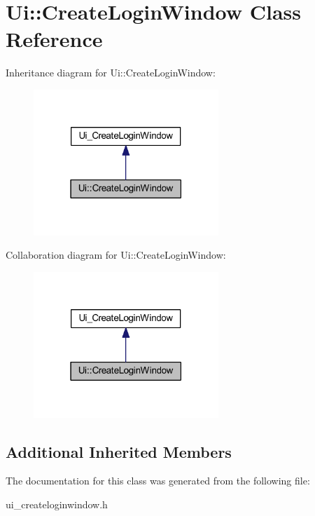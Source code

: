 \hypertarget{class_ui_1_1_create_login_window}{}\section{Ui\+:\+:Create\+Login\+Window Class Reference}
\label{class_ui_1_1_create_login_window}


Inheritance diagram for Ui\+:\+:Create\+Login\+Window\+:
\nopagebreak
\begin{figure}[H]
\begin{center}
\leavevmode
\includegraphics[width=198pt]{class_ui_1_1_create_login_window__inherit__graph}
\end{center}
\end{figure}


Collaboration diagram for Ui\+:\+:Create\+Login\+Window\+:
\nopagebreak
\begin{figure}[H]
\begin{center}
\leavevmode
\includegraphics[width=198pt]{class_ui_1_1_create_login_window__coll__graph}
\end{center}
\end{figure}
\subsection*{Additional Inherited Members}


The documentation for this class was generated from the following file\+:\begin{DoxyCompactItemize}
\item 
ui\+\_\+createloginwindow.\+h\end{DoxyCompactItemize}
